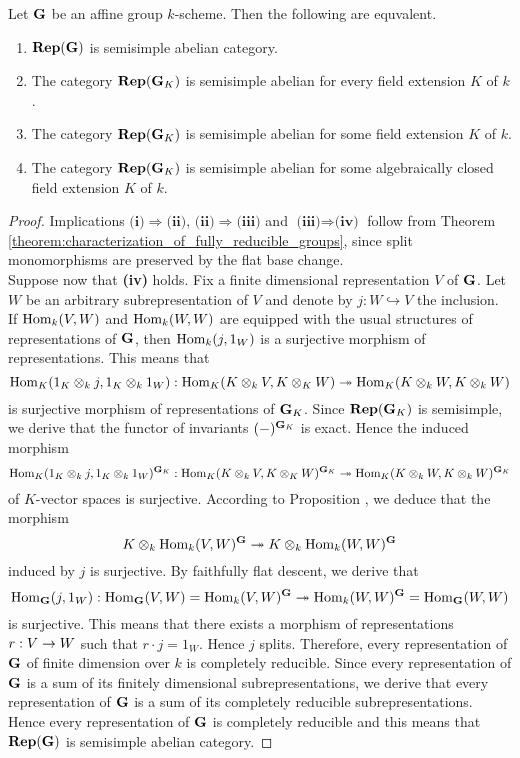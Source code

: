 \begin{theorem}\label{theorem:fully_reducible_groups_and_field_extension}
Let $\mathbf{G}$ be an affine group $k$-scheme. Then the following are equvalent.
\begin{enumerate}[label=\emph{\textbf{(\roman*)}}, leftmargin=3.0em]
\item $\mathbf{Rep}(\mathbf{G})$ is semisimple abelian category.
\item The category $\mathbf{Rep}(\mathbf{G}_K)$ is semisimple abelian for every field extension $K$ of $k$.
\item The category $\mathbf{Rep}(\mathbf{G}_K)$ is semisimple abelian for some field extension $K$ of $k$.
\item The category $\mathbf{Rep}(\mathbf{G}_K)$ is semisimple abelian for some algebraically closed field extension $K$ of $k$.
\end{enumerate}
\end{theorem}
\begin{proof}
Implications $\textbf{(i)}\Rightarrow \textbf{(ii)},\,\textbf{(ii)}\Rightarrow \textbf{(iii)}$ and $\textbf{(iii)}\Rightarrow \textbf{(iv)}$ follow from Theorem \ref{theorem:characterization_of_fully_reducible_groups}, since split monomorphisms are preserved by the flat base change.\\
Suppose now that \textbf{(iv)} holds. Fix a finite dimensional representation $V$ of $\mathbf{G}$. Let $W$ be an arbitrary subrepresentation of $V$ and denote by $j:W\hookrightarrow V$ the inclusion. If $\mathrm{Hom}_{k}(V,W)$ and $\mathrm{Hom}_{k}(W,W)$ are equipped with the usual structures of representations of $\mathbf{G}$, then $\mathrm{Hom}_{k}(j,1_W)$ is a surjective morphism of representations. This means that 
$$\mathrm{Hom}_{K}(1_K\otimes_kj,1_K\otimes_k1_W):\mathrm{Hom}_{K}(K\otimes_kV,K\otimes_KW) \twoheadrightarrow  \mathrm{Hom}_{K}(K\otimes_kW,K\otimes_kW)$$
is surjective morphism of representations of $\mathbf{G}_K$. Since $\mathbf{Rep}(\mathbf{G}_K)$ is semisimple, we derive that the functor of invariants $(-)^{\mathbf{G}_K}$ is exact. Hence the induced morphism
$$\mathrm{Hom}_{K}(1_K\otimes_kj,1_K\otimes_k1_W)^{\mathbf{G}_K}:\mathrm{Hom}_{K}(K\otimes_kV,K\otimes_KW)^{\mathbf{G}_K} \twoheadrightarrow \mathrm{Hom}_{K}(K\otimes_kW,K\otimes_kW)^{\mathbf{G}_K}$$
of $K$-vector spaces is surjective. According to Proposition , we deduce that the morphism 
$$K\otimes_k\mathrm{Hom}_{k}(V,W)^{\mathbf{G}} \twoheadrightarrow K\otimes_k \mathrm{Hom}_{k}(W,W)^{\mathbf{G}}$$
induced by $j$ is surjective. By faithfully flat descent, we derive that 
$$\mathrm{Hom}_{\mathbf{G}}(j,1_W):\mathrm{Hom}_{\mathbf{G}}(V,W)= \mathrm{Hom}_{k}(V,W)^{\mathbf{G}}\twoheadrightarrow \mathrm{Hom}_{k}(W,W)^{\mathbf{G}}=\mathrm{Hom}_{\mathbf{G}}(W,W)$$
is surjective. This means that there exists a morphism of representations $r:V\rightarrow W$ such that $r\cdot j = 1_W$. Hence $j$ splits. Therefore, every representation of $\mathbf{G}$ of finite dimension over $k$ is completely reducible. Since every representation of $\mathbf{G}$ is a sum of its finitely dimensional subrepresentations, we derive that every representation of $\mathbf{G}$ is a sum of its completely reducible subrepresentations. Hence every representation of $\mathbf{G}$ is completely reducible and this means that $\mathbf{Rep}(\mathbf{G})$ is semisimple abelian category.
\end{proof}

